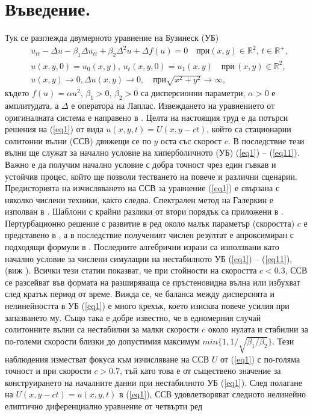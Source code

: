 \documentclass{article}
\newcommand{\rf}[1]{(\ref{#1})}
\newcommand{\RR}{\mathbb{R}}
\begin{document}
\section{Въведение.}\label{introduction}

Тук се разглежда двумерното уравнение на Бузинеск (УБ)
\begin{align}
&u_{tt} - \Delta u -\beta_1  \Delta u_{tt} +\beta_2 \Delta ^2 u + \Delta f(u)=0   \quad \text{при}  (x,y) \in \RR^2, \, t\in\RR^+,\label{eq1}
\\ \nonumber &u(x,y,0)=u_0(x,y), \, u_t(x,y,0)=u_1(x,y)   \quad\text{при} \, (x,y) \in \RR^2,
\\  &u(x,y) \rightarrow 0,  \Delta u(x,y) \rightarrow 0 ,  \quad \text{при}  \sqrt{x^2 + y^2} \rightarrow \infty, \label{eq11}
\end{align}
където $f(u)=\alpha u^2$, $\beta_1>0$, $\beta_2>0$ са дисперсионни параметри,  $\alpha>0$ е амплитудата, а $\Delta$ е оператора на Лаплас. Извеждането на уравнението от оригиналната система е направено в \cite{ChChr}. Целта на настоящия труд е да потърси решения на \rf{eq1} от вида $u(x,y,t)=U(x,y-ct)$, който са стационарни солитонни вълни (ССВ) движещи се по $y$ оста със скорост $c$. В последствие тези вълни ще служат за начално условие на хиперболичното (УБ) \rf{eq1} -- \rf{eq11}. Важно е да получим начално условие с добра точност чрез един гъвкав и устойчив процес, който ще позволи тестването на повече и различни сценарии. Предисторията на изчисляването на ССВ за уравнение \rf{eq1} е свързана с няколко числени техники, както следва. Спектрален метод на Галеркин е изполван в \cite{chr-chr-07,chr-chr}. Шаблони с крайни разлики от втори порядък са приложени в \cite{Ch2012}. Пертурбационно решение с развитие в ред около малък параметър (скоростта) $c$ е представено в  \cite{Ch2011}, а в последствие полученият числен резултат е апроксимиран с подходящи формули в \cite{Ch2011}. Последните алгебрични изрази са използвани като начално условие за числени симулации на нестабилното УБ \rf{eq1} -- \rf{eq11}, (виж  \cite{ref21, dani, milenaDani, ref22}). Всички тези статии показват, че при стойности на скоростта $c<0.3$, ССВ се разсейват във формата на разширяваща се пръстеновидна вълна или избухват след кратък период от време. Вижда се, че баланса между дисперсията и нелинейността в УБ \rf{eq1} е много крехък, което изисква повече усилия при запазването му. Също така е добре известно, че в едномерния случай солитонните вълни са нестабилни за малки скорости $c$ около нулата и стабилни за по-големи скорости близки до допустимия максимум $min\{1, 1/\sqrt{\beta_1/\beta_2}\}$.
Тези наблюдения изместват фокуса към изчисляване на ССВ $U$ от \rf{eq1} с по-голяма точност и при скорости $c > 0.7$, тъй като това е от съществено значение за конструирането на началните данни при нестабилното УБ \rf{eq1}. 
След полагане на $U(x,y-ct)=u(x,y,t)$ в \rf{eq1}, ССВ удовлетворяват следното нелинейно елиптично диференциално уравнение от четвърти ред
\end{document}
